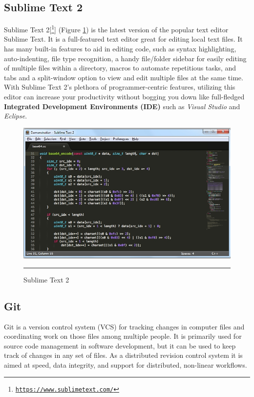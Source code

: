 \subsection{Sublime Text 2}
Sublime Text 2[\footnote{\href{https://www.sublimetext.com/}{\texttt{https://www.sublimetext.com/}}}] (Figure \ref{fig:sublime}) is the latest version of the popular text editor Sublime Text. It is a full-featured text
editor great for editing local text files. It has many built-in features to aid in editing code, such as
syntax highlighting, auto-indenting, file type recognition, a handy file/folder sidebar for easily
editing of multiple files within a directory, macros to automate repetitious tasks, and tabs and a
split-window option to view and edit multiple files at the same time. With Sublime Text 2's plethora
of programmer-centric features, utilizing this editor can increase your productivity without
bogging you down like full-fledged \textbf{Integrated Development Environments (IDE)} such as \textit{Visual
	Studio} and \textit{Eclipse}. 
\begin{figure}[h!]
	\centering
	\includegraphics[width=1\textwidth]{./images/sublime.jpg}
	\rule{1\textwidth}{1pt}
	\caption{Sublime Text 2}
	\label{fig:sublime}
\end{figure}

\subsection{Git}
Git is a version control system (VCS) for tracking changes in computer files and coordinating work on those files among multiple people. It is primarily used for source code management in software development, but it can be used to keep track of changes in any set of files. As a distributed revision control system it is aimed at speed, data integrity, and support for distributed, non-linear workflows.
\newline

